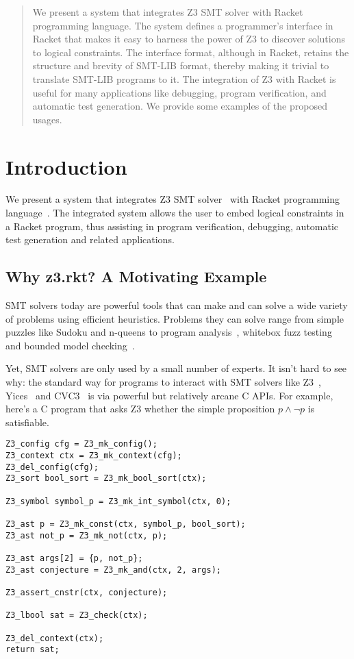 \begin{abstract}
 We present a system that integrates Z3 SMT solver with
 Racket programming language. The system defines a programmer's
 interface in Racket that makes it easy to harness the power
 of Z3 to discover solutions to logical constraints. The
 interface format, although in Racket, retains the structure
 and brevity of SMT-LIB format, thereby making it trivial to
 translate SMT-LIB programs to it. The integration of Z3
 with Racket is useful for many applications like debugging,
 program verification, and automatic test generation. We
 provide some examples of the proposed usages.
\end{abstract}
\section{Introduction}
We present a system that integrates Z3 SMT solver~\cite{z3} with
Racket programming language~\cite{racket}. The integrated
system allows the user to embed logical constraints in a
Racket program, thus assisting in program verification,
debugging, automatic test generation and related
applications.

\subsection{Why z3.rkt? A Motivating Example}
\label{sec:motiv}

SMT solvers today are powerful tools that can make and can solve a wide variety
of problems using efficient heuristics. Problems they can solve range from
simple puzzles like Sudoku and n-queens to program analysis~\cite{Gulwani:08},
whitebox fuzz testing~\cite{Godefroid:08} and bounded model
checking~\cite{Armando:09}.

Yet, SMT solvers are only used by a small number of experts. It isn't hard to
see why: the standard way for programs to interact with SMT solvers like
Z3~\cite{z3}, Yices~\cite{yices} and CVC3~\cite{cvc3} is via powerful but
relatively arcane C APIs. For example, here's a C program that asks Z3 whether
the simple proposition $p \wedge \neg p$ is satisfiable.

\begin{verbatim}
Z3_config cfg = Z3_mk_config();
Z3_context ctx = Z3_mk_context(cfg);
Z3_del_config(cfg);
Z3_sort bool_sort = Z3_mk_bool_sort(ctx);

Z3_symbol symbol_p = Z3_mk_int_symbol(ctx, 0);

Z3_ast p = Z3_mk_const(ctx, symbol_p, bool_sort);
Z3_ast not_p = Z3_mk_not(ctx, p);

Z3_ast args[2] = {p, not_p};
Z3_ast conjecture = Z3_mk_and(ctx, 2, args);

Z3_assert_cnstr(ctx, conjecture);

Z3_lbool sat = Z3_check(ctx);

Z3_del_context(ctx);
return sat;
\end{verbatim}

